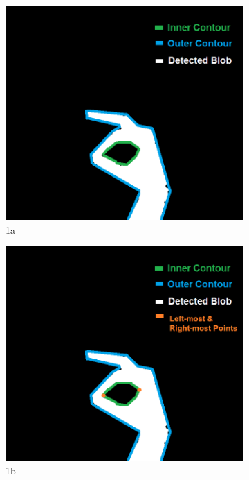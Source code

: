 \begin{figure}
\begin{subfigure}{.5\textwidth}
  \centering
  \includegraphics[width=.8\linewidth]{Files/Figures/2.png}
  \caption{1a}
  \label{fig:sfig1}
\end{subfigure}%
\begin{subfigure}{.5\textwidth}
  \centering
  \includegraphics[width=.8\linewidth]{Files/Figures/3.png}
  \caption{1b}
  \label{fig:sfig2}
\end{subfigure}\\
\begin{subfigure}{.5\textwidth}
  \centering

\end{subfigure}
\end{figure}
